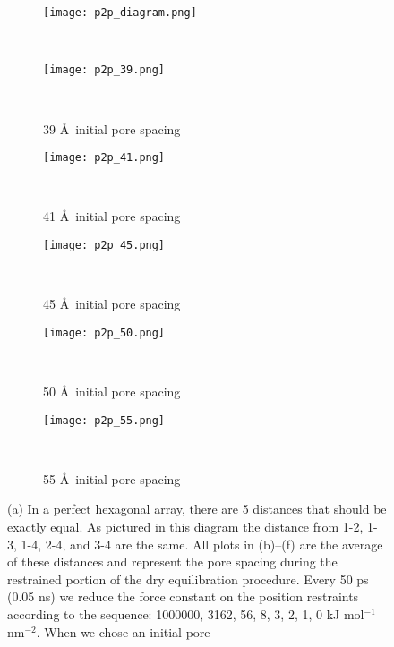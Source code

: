   	\begin{figure}[!htb]
	\centering
	\begin{subfigure}{0.3\textwidth}
	\texttt{[image: p2p\_diagram.png]}
	\caption{}~\label{S-fig:p2p_diagram}
  	\end{subfigure} 
	\begin{subfigure}{0.3\textwidth}
		\texttt{[image: p2p\_39.png]}\quad
		\vspace{-1.25em}
		\caption{39 \AA~initial pore spacing}~\label{S-fig:p2p_39}
	\end{subfigure}
	\begin{subfigure}{0.3\textwidth}
		\texttt{[image: p2p\_41.png]}\quad
		\vspace{-1.25em}
		\caption{41 \AA~initial pore spacing}~\label{S-fig:p2p_41}
	\end{subfigure}
	\begin{subfigure}{0.3\textwidth}
		\texttt{[image: p2p\_45.png]}
		\vspace{-1.25em}
		\caption{45 \AA~initial pore spacing}~\label{S-fig:p2p_45}
	\end{subfigure}
	\begin{subfigure}{0.3\textwidth}
		\texttt{[image: p2p\_50.png]}\quad	
		\vspace{-1.25em}
		\caption{50 \AA~initial pore spacing}~\label{S-fig:p2p_50}
	\end{subfigure}
	\begin{subfigure}{0.3\textwidth}
		\texttt{[image: p2p\_55.png]}
		\vspace{-1.25em}
		\caption{55 \AA~initial pore spacing}~\label{S-fig:p2p_55}
	\end{subfigure}
	\caption{(a) In a perfect hexagonal array, there are 5 distances that should be exactly
	equal. As pictured in this diagram the distance from 1-2, 1-3, 1-4, 2-4, and 3-4
	are the same. All plots in (b)--(f) are the average of these distances and represent
	the pore spacing during the restrained portion of the dry equilibration procedure.
	Every 50 ps (0.05 ns) we reduce the force constant on the position restraints according to the sequence: 1000000,
	3162, 56, 8, 3, 2, 1, 0 kJ mol$^{-1}$ nm$^{-2}$. When we chose an initial pore
}
\end{figure}
